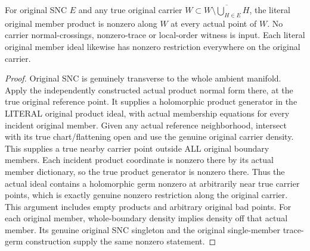 \begin{theorem}
\label{hir:sharp-original-member-product-nonzero-along-all-carrier-points}
\leanok
For original SNC $E$ and any true original carrier
$W\subset\overline{W\setminus\bigcup_{H\in E}H}$, the literal original
member product is nonzero along $W$ at every actual point of $W$.
No carrier normal-crossings, nonzero-trace or local-order witness is input.
Each literal original member ideal likewise has nonzero restriction
everywhere on the original carrier.
\end{theorem}
\begin{proof}
Original SNC is genuinely transverse to the whole ambient manifold.
Apply the independently constructed actual product normal form there,
at the true original reference point. It supplies a holomorphic product
generator in the LITERAL original product ideal, with actual membership
equations for every incident original member. Given any actual reference
neighborhood, intersect with its true chart/flattening open and use the
genuine original carrier density. This supplies a true nearby carrier
point outside ALL original boundary members. Each incident product
coordinate is nonzero there by its actual member dictionary, so the
true product generator is nonzero there. Thus the actual ideal contains
a holomorphic germ nonzero at arbitrarily near true carrier points,
which is exactly genuine nonzero restriction along the original carrier.
This argument includes empty products and arbitrary original bad points.
For each original member, whole-boundary density implies density off
that actual member. Its genuine original SNC singleton and the original
single-member trace-germ construction supply the same nonzero statement.
\end{proof}

